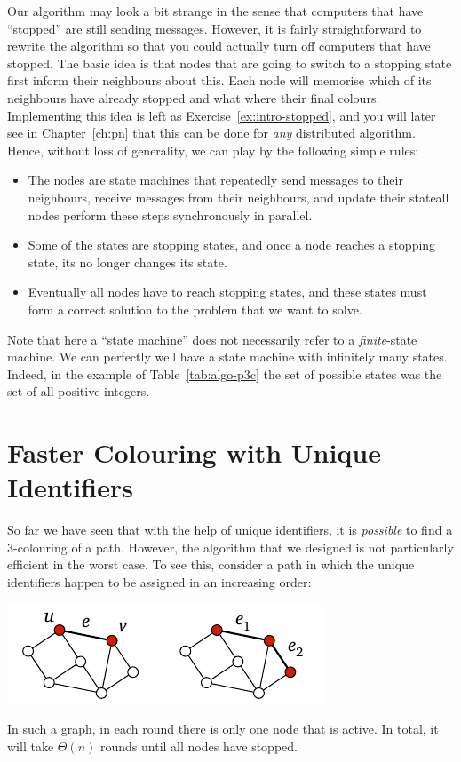 Our algorithm may look a bit strange in the sense that computers that have ``stopped'' are still sending messages. However, it is fairly straightforward to rewrite the algorithm so that you could actually turn off computers that have stopped. The basic idea is that nodes that are going to switch to a stopping state first inform their neighbours about this. Each node will memorise which of its neighbours have already stopped and what where their final colours. Implementing this idea is left as Exercise~\ref{ex:intro-stopped}, and you will later see in Chapter~\ref{ch:pn} that this can be done for \emph{any} distributed algorithm. Hence, without loss of generality, we can play by the following simple rules:
\begin{itemize}
    \item The nodes are state machines that repeatedly send messages to their neighbours, receive messages from their neighbours, and update their state\mydash all nodes perform these steps synchronously in parallel.
    \item Some of the states are stopping states, and once a node reaches a stopping state, its no longer changes its state.
    \item Eventually all nodes have to reach stopping states, and these states must form a correct solution to the problem that we want to solve.
\end{itemize}
Note that here a ``state machine'' does not necessarily refer to a \emph{finite}-state machine. We can perfectly well have a state machine with infinitely many states. Indeed, in the example of Table~\ref{tab:algo-p3c} the set of possible states was the set of all positive integers.


\section{Faster Colouring with Unique Identifiers}\label{sec:algo-p3cbit}

So far we have seen that with the help of unique identifiers, it is \emph{possible} to find a $3$-colouring of a path. However, the algorithm that we designed is not particularly efficient in the worst case. To see this, consider a path in which the unique identifiers happen to be assigned in an increasing order:
\begin{center}
    \includegraphics[page=\PIntroIdBad]{figs.pdf}
\end{center}
In such a graph, in each round there is only one node that is active. In total, it will take $\Theta(n)$ rounds until all nodes have stopped.

